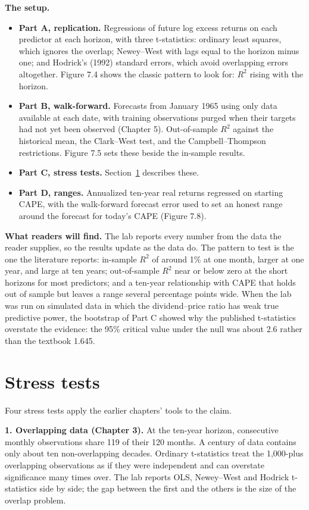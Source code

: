 \textbf{The setup.}

\begin{itemize}
  \item \textbf{Part A, replication.} Regressions of future log excess returns on each predictor at each horizon, with three t-statistics: ordinary least squares, which ignores the overlap; Newey--West with lags equal to the horizon minus one; and Hodrick's (1992) standard errors, which avoid overlapping errors altogether. Figure 7.4 shows the classic pattern to look for: $R^2$ rising with the horizon.
  \item \textbf{Part B, walk-forward.} Forecasts from January 1965 using only data available at each date, with training observations purged when their targets had not yet been observed (Chapter 5). Out-of-sample $R^2$ against the historical mean, the Clark--West test, and the Campbell--Thompson restrictions. Figure 7.5 sets these beside the in-sample results.
  \item \textbf{Part C, stress tests.} Section~\ref{sec:07-stress} describes these.
  \item \textbf{Part D, ranges.} Annualized ten-year real returns regressed on starting CAPE, with the walk-forward forecast error used to set an honest range around the forecast for today's CAPE (Figure 7.8).
\end{itemize}

\textbf{What readers will find.} The lab reports every number from the data the reader supplies, so the results update as the data do. The pattern to test is the one the literature reports: in-sample $R^2$ of around 1\% at one month, larger at one year, and large at ten years; out-of-sample $R^2$ near or below zero at the short horizons for most predictors; and a ten-year relationship with CAPE that holds out of sample but leaves a range several percentage points wide. When the lab was run on simulated data in which the dividend--price ratio has weak true predictive power, the bootstrap of Part C showed why the published t-statistics overstate the evidence: the 95\% critical value under the null was about 2.6 rather than the textbook 1.645.

\section{Stress tests}
\label{sec:07-stress}

Four stress tests apply the earlier chapters' tools to the claim.

\textbf{1. Overlapping data (Chapter 3).} At the ten-year horizon, consecutive monthly observations share 119 of their 120 months. A century of data contains only about ten non-overlapping decades. Ordinary t-statistics treat the 1,000-plus overlapping observations as if they were independent and can overstate significance many times over. The lab reports OLS, Newey--West and Hodrick t-statistics side by side; the gap between the first and the others is the size of the overlap problem.

